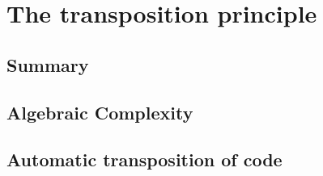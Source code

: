 \newcommand{\bom}{\perp}  %
\newcommand{\al}{\prec}
\newcommand{\tAL}{\textsf{transAL}}
\newcommand{\Sbasis}{\mathcal{S}}  %
\newcommand{\Tbasis}{\mathcal{L}}  %
\newcommand{\lmul}[1]{{}_{#1}*}  %
\newcommand{\rmul}[1]{*_{#1}}  %
\newcommand{\RMod}[1]{#1\text{\sf-Mod}}  %
\newcommand{\ModR}[1]{\text{\sf Mod-}#1}  %
\newcommand{\pspace}{\mathcal{P}}  %
\newcommand{\s}{\underline}
\renewcommand{\l}{\overline}




\part{The transposition principle}

\chapter{Summary}


\chapter{Algebraic Complexity}





\chapter{Automatic transposition of code}







